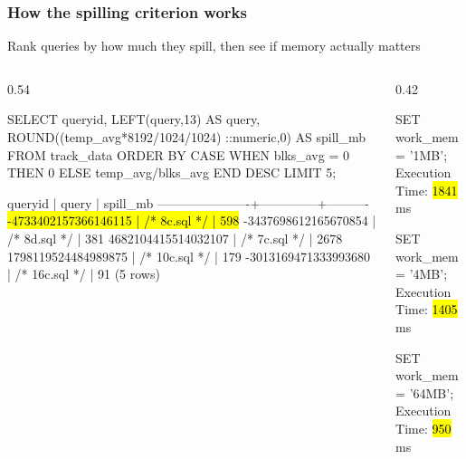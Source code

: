 \documentclass{beamer}
\newcommand\kw[1]{\textcolor{pgblue}{#1}}       %
\newcommand\sqlnum[1]{\textcolor{ptoaccent}{#1}} %
\begin{document}
\begin{frame}[fragile]\frametitle{How the spilling criterion works}
\vspace{-0.4em}
{\small\color{ptoink}Rank queries by how much they spill, then see if memory actually matters}

\medskip
\begin{columns}[T,onlytextwidth]

\begin{column}{0.54\textwidth}
\begin{sql}[fontsize=\tiny]
\kw{SELECT} queryid, \kw{LEFT}(query,\sqlnum{13}) \kw{AS} query,
  \kw{ROUND}((temp_avg*\sqlnum{8192}/\sqlnum{1024}/\sqlnum{1024})
    ::numeric,\sqlnum{0}) \kw{AS} spill_mb
\kw{FROM} track_data
\kw{ORDER BY} \kw{CASE WHEN} blks_avg = \sqlnum{0} \kw{THEN} \sqlnum{0}
  \kw{ELSE} temp_avg/blks_avg \kw{END} \kw{DESC}
\kw{LIMIT} \sqlnum{5};
\end{sql}

\begin{psql}[fontsize=\tiny]
      queryid         |    query     | spill_mb
----------------------+--------------+----------
\hl{ -4733402157366146115 | /* 8c.sql */  |      598}
 -3437698612165670854 | /* 8d.sql */  |      381
  4682104415514032107 | /* 7c.sql */  |     2678
  1798119524484989875 | /* 10c.sql */ |      179
 -3013169471333993680 | /* 16c.sql */ |       91
(5 rows)
\end{psql}
\end{column}

\begin{column}{0.42\textwidth}
\par\smallskip
\begin{psql}[fontsize=\scriptsize]
\kw{SET} work_mem = '1MB';
Execution Time: \hl{1841} ms

\kw{SET} work_mem = '4MB';
Execution Time: \hl{1405} ms

\kw{SET} work_mem = '64MB';
Execution Time: \hl{950} ms
\end{psql}
\end{column}

\end{columns}
\end{frame}

\end{document}
